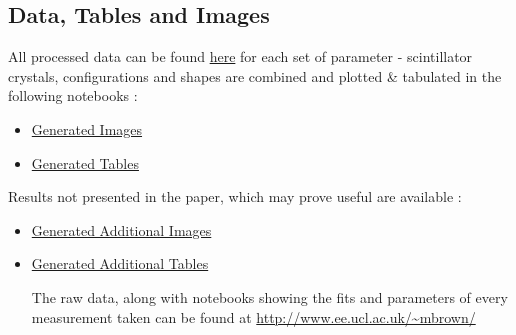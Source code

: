 \subsection{Data, Tables and Images}
All processed data can be found \href{https://github.com/marksbrown/doipaper/tree/master/processeddata}{here} for each set of parameter - scintillator crystals, configurations and shapes are combined and plotted \& tabulated in the following notebooks :
\begin{itemize}
\item \href{http://nbviewer.ipython.org/github/marksbrown/doipaper/blob/master/notebooks/Generate\%20Images.ipynb}{Generated Images}
\item \href{http://nbviewer.ipython.org/github/marksbrown/doipaper/blob/master/notebooks/Generate\%20Tables.ipynb}{Generated Tables}
\end{itemize}
Results not presented in the paper, which may prove useful are available :
\begin{itemize}
\item \href{http://nbviewer.ipython.org/github/marksbrown/doipaper/blob/master/notebooks/Generate\%20Additional\%20Images.ipynb}{Generated Additional Images}
\item \href{http://nbviewer.ipython.org/github/marksbrown/doipaper/blob/master/notebooks/Generate\%20Additional\%20Tables.ipynb}{Generated Additional Tables}

The raw data, along with notebooks showing the fits and parameters of every measurement taken can be found at \url{http://www.ee.ucl.ac.uk/~mbrown/}
\end{itemize}

